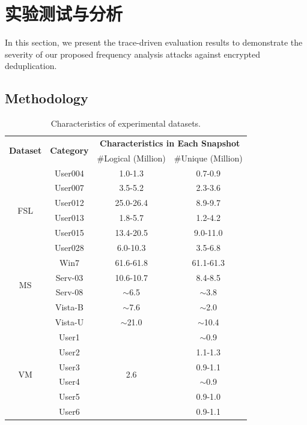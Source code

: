 \chapter{实验测试与分析}
\label{sec:Experiment}

In this section, we present the trace-driven evaluation results to demonstrate
the severity of our proposed frequency analysis attacks against encrypted
deduplication.

\section{Methodology}
\label{sec:dataset}

\begin{table}[!t]
    \caption{Characteristics of experimental datasets.}
\small
\label{tab:dataset}
\renewcommand{\arraystretch}{1.2}
\vspace{-3pt}
\centering
\begin{tabular}{|c|c|c|c|}
\hline
 \multirow{2}{*}{\bf Dataset} & \multirow{2}{*}{\bf Category} & \multicolumn{2}{c|}{\bf Characteristics in Each Snapshot} \\
\cline{3-4}
    & &  \#Logical (Million) & \#Unique (Million) \\
\hline
    \multirow{6}{*}{FSL} & User004  & 1.0-1.3 & 0.7-0.9\\
 \cline{2-4}
              & User007 &  3.5-5.2 & 2.3-3.6 \\
 \cline{2-4}
              & User012 &  25.0-26.4 & 8.9-9.7 \\
\cline{2-4}
              & User013 &  1.8-5.7 & 1.2-4.2 \\
\cline{2-4}
              & User015 &  13.4-20.5 & 9.0-11.0 \\
\cline{2-4}
              & User028 &  6.0-10.3 & 3.5-6.8 \\
\hline
\hline
    \multirow{4}{*}{MS} & Win7  & 61.6-61.8 & 61.1-61.3\\
\cline{2-4}
              & Serv-03 & 10.6-10.7 & 8.4-8.5\\
\cline{2-4}
              & Serv-08 & $\sim$6.5 & $\sim$3.8 \\
\cline{2-4}
              & Vista-B &  $\sim$7.6 & $\sim$2.0\\
\cline{2-4}
              & Vista-U &  $\sim$21.0 & $\sim$10.4 \\
\hline
\hline

    \multirow{6}{*}{VM} & User1  &  \multirow{6}{*}{2.6} & $\sim$0.9 \\
\cline{2-2}
\cline{4-4}
              & User2 &  & 1.1-1.3 \\
\cline{2-2}
\cline{4-4}
              & User3 &  & 0.9-1.1 \\
\cline{2-2}
\cline{4-4}
              & User4 &  & $\sim$0.9 \\
\cline{2-2}
\cline{4-4}
              & User5 &  & 0.9-1.0 \\
\cline{2-2}
\cline{4-4}
              & User6 &  & 0.9-1.1 \\
\hline
\end{tabular}
\medskip


\end{table}
